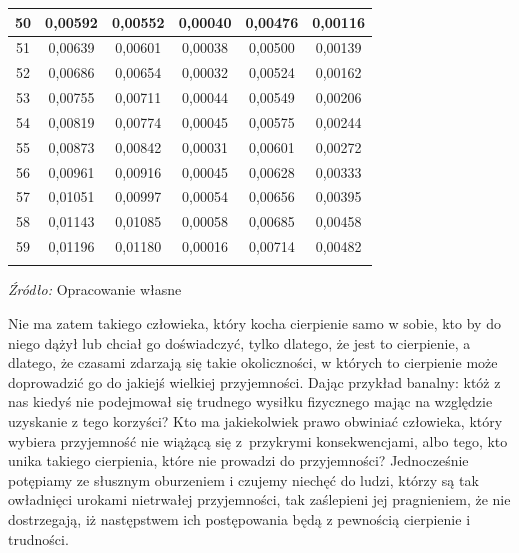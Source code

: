 \documentclass[12pt]{mwbk}
\theoremstyle{plain}
\theoremstyle{definition}
\theoremstyle{remark}
\newcommand\zrodlotab[1]{{\par\vspace{2mm}\small\textit{Źródło: }#1 }}
\begin{document}
\begin{center}
\begin{longtable}{|c|c|c|c|c|c|}
50 & 0,00592 & 0,00552 & 0,00040  & 0,00476 &  0,00116 \\ \hline
51 & 0,00639 & 0,00601 & 0,00038  & 0,00500 &  0,00139 \\ \hline
52 & 0,00686 & 0,00654 & 0,00032  & 0,00524 &  0,00162 \\ \hline
53 & 0,00755 & 0,00711 & 0,00044  & 0,00549 &  0,00206 \\ \hline
54 & 0,00819 & 0,00774 & 0,00045  & 0,00575 &  0,00244 \\ \hline
55 & 0,00873 & 0,00842 & 0,00031  & 0,00601 &  0,00272 \\ \hline
56 & 0,00961 & 0,00916 & 0,00045  & 0,00628 &  0,00333 \\ \hline
57 & 0,01051 & 0,00997 & 0,00054  & 0,00656 &  0,00395 \\ \hline
58 & 0,01143 & 0,01085 & 0,00058  & 0,00685 &  0,00458 \\ \hline
59 & 0,01196 & 0,01180 & 0,00016  & 0,00714 &  0,00482
	\\\hhline{|======|}
\end{longtable}
\vspace{-7mm}    %
\zrodlotab{Opracowanie własne}	
	\end{center}








Nie ma zatem takiego człowieka, który kocha cierpienie samo w sobie, 
kto by do niego dążył lub chciał go doświadczyć, tylko dlatego, że
jest to cierpienie, a dlatego, że czasami zdarzają się takie 
okoliczności, w których to cierpienie może doprowadzić 
go do jakiejś wielkiej przyjemności. 
Dając przykład banalny: któż z nas kiedyś nie podejmował 
się trudnego wysiłku fizycznego mając na względzie 
uzyskanie z tego korzyści? 
Kto ma jakiekolwiek prawo obwiniać człowieka, 
który wybiera przyjemność nie wiążącą się z~przykrymi 
konsekwencjami, albo tego, kto unika takiego cierpienia, 
które nie prowadzi do przyjemności? 
Jednocześnie potępiamy ze słusznym oburzeniem i czujemy 
niechęć do ludzi, którzy są tak owładnięci urokami nietrwałej 
przyjemności, tak zaślepieni jej pragnieniem, 
że nie dostrzegają, iż następstwem ich 
postępowania będą z pewnością cierpienie i trudności.
\end{document}
